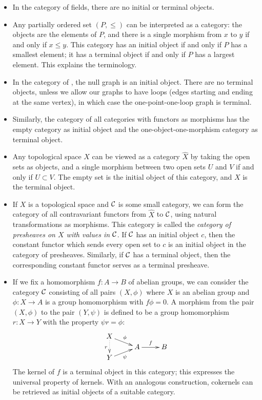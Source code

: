 \documentclass[12pt]{article}
\begin{document}
\begin {itemize}
\item In the category of fields, there are no initial or terminal objects.

\item Any partially ordered set $(P,\le)$ can be interpreted as a category: the objects are the elements of $P$, and there is a single morphism from $x$ to $y$ if and only if $x\le y$. This category has an initial object if and only if $P$ has a smallest element; it has a terminal object if and only if $P$ has a largest element. This explains the terminology.

\item In the category of , the null graph is an initial object. There are no terminal objects, unless we allow our graphs to have loops (edges starting and ending at the same vertex), in which case the one-point-one-loop graph is terminal.

\item Similarly, the category of all  categories with functors as morphisms has the empty category as initial object and the one-object-one-morphism category as terminal object.

\item Any topological space $X$ can be viewed as a category $\hat{X}$ by taking the open sets as objects, and a single morphism between two open sets $U$ and $V$ if and only if $U\subset V$. The empty set is the initial object of this category, and $X$ is the terminal object. 

\item If $X$ is a topological space and $\cal{C}$ is some small category, we can form the category of all contravariant functors from $\hat{X}$ to $\cal{C}$, using natural transformations as morphisms. This category is called the \emph{category of presheaves on $X$ with values in $\cal{C}$}. If $\cal{C}$ has an initial object $c$, then the constant functor which sends every open set to $c$ is an initial object in the category of presheaves. Similarly, if $\cal{C}$ has a terminal object, then the corresponding constant functor serves as a terminal presheave.

\item If we fix a homomorphism $f:A\rightarrow B$ of abelian groups, we can consider the category $\cal{C}$ consisting of all pairs $(X,\phi)$ where $X$ is an abelian group and $\phi:X\rightarrow A$ is a group homomorphism with $f\phi=0$. A morphism from the pair $(X,\phi)$ to the pair $(Y,\psi)$ is defined to be a group homomorphism $r:X\rightarrow Y$ with the property $\psi r=\phi$:
$$
\xymatrix@R-=2pt{%
X\ar[dr]^\phi\ar@{.>}[dd]_r\\
&A\ar[r]^f& B\\
Y\ar[ur]_\psi
}
$$
The kernel of $f$ is a terminal object in this category; this expresses the universal property of kernels. With an analogous construction, cokernels can be retrieved as initial objects of a suitable category.


\end{itemize}
\end{document}
